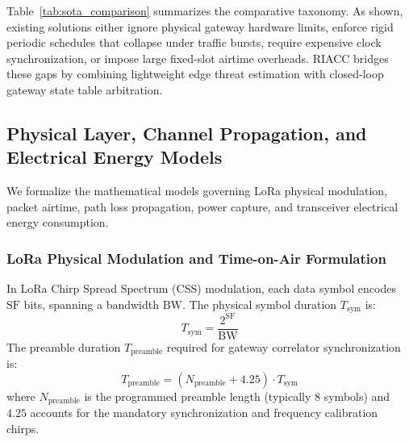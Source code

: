 \documentclass[preprint,review,12pt]{elsarticle}
\begin{document}
Table~\ref{tab:sota_comparison} summarizes the comparative taxonomy. As shown, existing solutions either ignore physical gateway hardware limits, enforce rigid periodic schedules that collapse under traffic bursts, require expensive clock synchronization, or impose large fixed-slot airtime overheads. RIACC bridges these gaps by combining lightweight edge threat estimation with closed-loop gateway state table arbitration.

\subsection{Physical Layer, Channel Propagation, and Electrical Energy Models}

We formalize the mathematical models governing LoRa physical modulation, packet airtime, path loss propagation, power capture, and transceiver electrical energy consumption.

\subsubsection{LoRa Physical Modulation and Time-on-Air Formulation}
In LoRa Chirp Spread Spectrum (CSS) modulation, each data symbol encodes $\text{SF}$ bits, spanning a bandwidth $\text{BW}$. The physical symbol duration $T_{\text{sym}}$ is:
\begin{equation}
\label{eq:tsym}
T_{\text{sym}} = \frac{2^{\text{SF}}}{\text{BW}}
\end{equation}
The preamble duration $T_{\text{preamble}}$ required for gateway correlator synchronization is:
\begin{equation}
\label{eq:tpreamble}
T_{\text{preamble}} = (N_{\text{preamble}} + 4.25) \cdot T_{\text{sym}}
\end{equation}
where $N_{\text{preamble}}$ is the programmed preamble length (typically $8$ symbols) and $4.25$ accounts for the mandatory synchronization and frequency calibration chirps.
\end{document}
